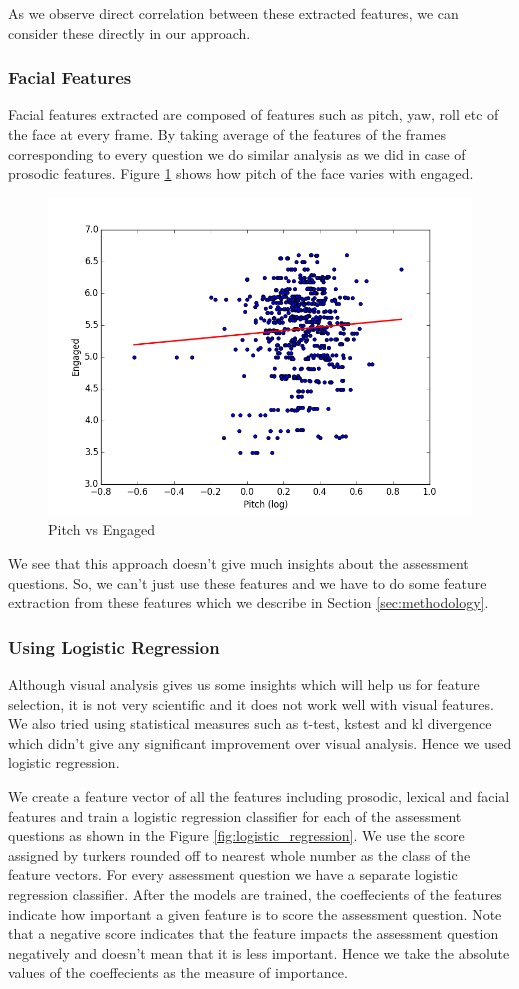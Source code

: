 \documentclass[11pt]{article}
\begin{document}
As we observe direct correlation between these extracted features, we can consider these directly in our approach.

\subsubsection{Facial Features}
Facial features extracted are composed of features such as pitch, yaw, roll etc of the face at every frame. By taking average of the features of the frames corresponding to every question we do similar analysis as we did in case of prosodic features. Figure \ref{fig:facial_analysis} shows how pitch of the face varies with engaged.

\begin{figure}[H]
\begin{center}
\includegraphics[width=0.6\columnwidth]{figures/Engaged and Pitch.png}
\caption{Pitch vs Engaged}
\label{fig:facial_analysis}
\end{center}
\end{figure}

We see that this approach doesn't give much insights about the assessment questions. So, we can't just use these features and we have to do some feature extraction from these features which we describe in Section \ref{sec:methodology}.
\subsubsection{Using Logistic Regression}
Although visual analysis gives us some insights which will help us for feature selection, it is not very scientific and it does not work well with visual features. We also tried using statistical measures such as t-test, kstest and kl divergence which didn't give any significant improvement over visual analysis. Hence we used logistic regression. 

We create a feature vector of all the features including prosodic, lexical and facial features and train a logistic regression classifier for each of the assessment questions as shown in the Figure \ref{fig:logistic_regression}. We use the score assigned by turkers rounded off to nearest whole number as the class of the feature vectors. For every assessment question we have a separate logistic regression classifier. After the models are trained, the coeffecients of the features indicate how important a given feature is to score the assessment question. Note that a negative score indicates that the feature impacts the assessment question negatively and doesn't mean that it is less important. Hence we take the absolute values of the coeffecients as the measure of importance.
\end{document}
